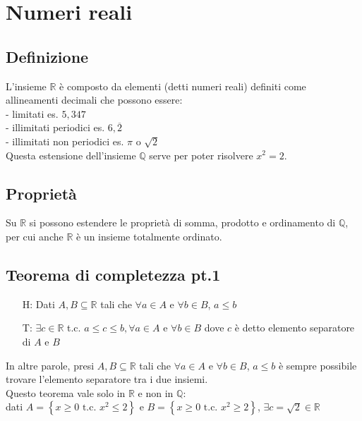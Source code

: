 \documentclass[a4paper]{article}
\begin{document}
\newpage

\section{Numeri reali}
\subsection{Definizione}
L'insieme \(\mathbb{R}\) è composto da elementi (detti numeri reali) definiti come allineamenti decimali che possono essere: \\
- limitati es. \(5,347\) \\
- illimitati periodici es. \(6,\overline{2}\) \\
- illimitati non periodici es. \(\pi\) o \(\sqrt{2}\) \\
Questa estensione dell'insieme \(\mathbb{Q}\) serve per poter risolvere \(x^2 = 2\).


\subsection{Proprietà}
Su \(\mathbb{R}\) si possono estendere le proprietà di somma, prodotto e ordinamento di \(\mathbb{Q}\), per cui anche \(\mathbb{R}\) è un insieme totalmente ordinato.


\subsection{Teorema di completezza pt.1}
\begin{itemize}
	\item[H:] Dati \(A, B \subseteq \mathbb{R}\) tali che \(\forall a \in A\) e \(\forall b \in B\), \(a \leq b\)
	\item[T:] \(\exists c \in \mathbb{R}\) t.c. \(a \leq c \leq b, \forall a \in A\) e \(\forall b \in B\) dove \(c\) è detto elemento separatore di \(A\) e \(B\)
\end{itemize}
In altre parole, presi \(A, B \subseteq \mathbb{R}\) tali che \(\forall a \in A\) e \(\forall b \in B\), \(a \leq b\) è sempre possibile trovare l'elemento separatore tra i due insiemi. \\
Questo teorema vale solo in \(\mathbb{R}\) e non in \(\mathbb{Q}\): \\
dati \(A=\left\{ x \geq 0 \text{ t.c. } x^2 \leq 2 \right\}\) e \(B=\left\{ x \geq 0 \text{ t.c. } x^2 \geq 2 \right\}\), \(\exists c = \sqrt{2} \in \mathbb{R}\)
\end{document}
